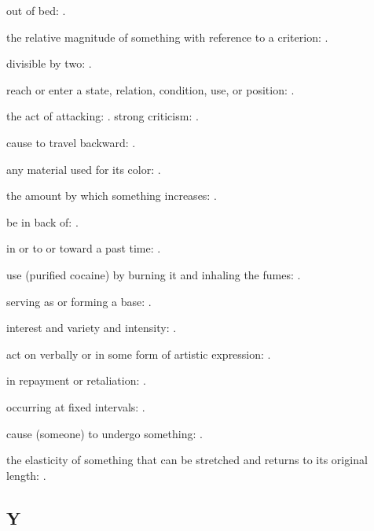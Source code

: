   out of bed:   .

  the relative magnitude of something with reference to a criterion: .

  divisible by two: .

  reach or enter a state, relation, condition, use, or position: .

  the act of attacking:   . strong criticism: .

  cause to travel backward: .

  any material used for its color:   .

  the amount by which something increases:   .

  be in back of: .

  in or to or toward a past time:   .

  use (purified cocaine) by burning it and inhaling the fumes:   .

  serving as or forming a base:   .

  interest and variety and intensity:   .

  act on verbally or in some form of artistic expression:   .

  in repayment or retaliation: .

  occurring at fixed intervals:   .

  cause (someone) to undergo something: .

  the elasticity of something that can be stretched and returns to its original length:   .

\subsection*{Y}

